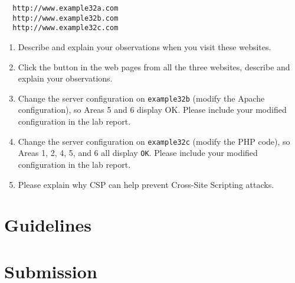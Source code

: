 \begin{lstlisting}
  http://www.example32a.com
  http://www.example32b.com
  http://www.example32c.com
\end{lstlisting}

\begin{enumerate}

\item Describe and explain your observations when you visit these websites.

\item Click the button in the web pages from all the three websites, describe and 
explain your observations. 

\item Change the server configuration on \texttt{example32b} (modify the Apache 
configuration), so Areas 5 and 6 display OK. 
Please include your modified configuration in the lab report.

\item Change the server configuration on \texttt{example32c} (modify the PHP code), so 
Areas 1, 2, 4, 5, and 6 all display \texttt{OK}. 
Please include your modified configuration in the lab report.

\item Please explain why CSP can help prevent Cross-Site Scripting attacks. 

\end{enumerate}
 




\section{Guidelines}
\label{xss:sec:guidelines}





\section{Submission}






